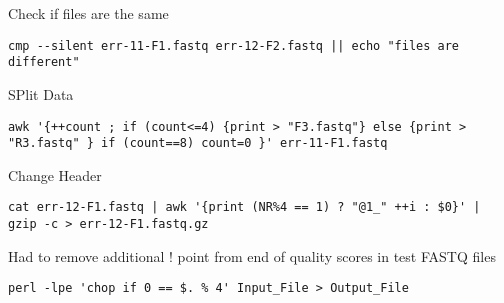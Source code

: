 \documentclass[idxtotoc,hyperref,openany,oneside]{labbook} %
\begin{document}
\begin{table}[]
\end{table}



Check if files are the same
\begin{verbatim}
cmp --silent err-11-F1.fastq err-12-F2.fastq || echo "files are different"
\end{verbatim}


SPlit Data
\begin{verbatim}
awk '{++count ; if (count<=4) {print > "F3.fastq"} else {print > "R3.fastq" } if (count==8) count=0 }' err-11-F1.fastq
\end{verbatim}


Change Header
\begin{verbatim}
cat err-12-F1.fastq | awk '{print (NR%4 == 1) ? "@1_" ++i : $0}' | gzip -c > err-12-F1.fastq.gz
\end{verbatim}


Had to remove additional ! point from end of quality scores in test FASTQ files 

\begin{verbatim}
perl -lpe 'chop if 0 == $. % 4' Input_File > Output_File
\end{verbatim}
\end{document}
